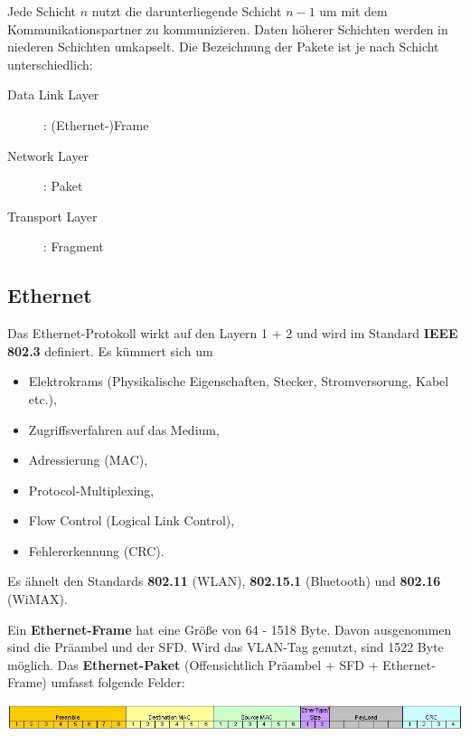 \documentclass{article} %
\begin{document}
Jede Schicht $n$ nutzt die darunterliegende Schicht $n-1$ um mit dem Kommunikationspartner zu kommunizieren.
Daten höherer Schichten werden in niederen Schichten umkapselt.
Die Bezeichnung der Pakete ist je nach Schicht unterschiedlich:
\begin{description}
	\item[Data Link Layer]: (Ethernet-)Frame
	\item[Network Layer]: Paket
	\item[Transport Layer]: Fragment
\end{description}

\subsection{Ethernet}
\label{subsec:ethernet}
Das Ethernet-Protokoll wirkt auf den Layern 1 + 2 und wird im Standard \textbf{IEEE 802.3} definiert.
Es kümmert sich um 
	\begin{itemize}		
		\item Elektrokrams (Physikalische Eigenschaften, Stecker, Stromversorung, Kabel etc.),
		\item Zugriffsverfahren auf das Medium,
		\item Adressierung (MAC),
		\item Protocol-Multiplexing,
		\item Flow Control (Logical Link Control),
		\item Fehlererkennung (CRC). 
	\end{itemize}
Es ähnelt den Standards \textbf{802.11} (WLAN), \textbf{802.15.1} (Bluetooth) und \textbf{802.16} (WiMAX).

Ein \textbf{Ethernet-Frame} hat eine Größe von 64 - 1518 Byte.
Davon ausgenommen sind die Präambel und der SFD.
Wird das VLAN-Tag genutzt, sind 1522 Byte möglich.
Das \textbf{Ethernet-Paket} (Offensichtlich Präambel + SFD + Ethernet-Frame) umfasst folgende Felder:

\includegraphics[width=16cm]{img/EthernetFrame.jpg}
\end{document}
